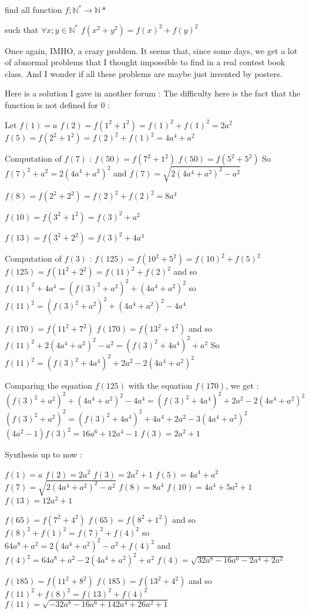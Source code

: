 \begin{solution}
	\begin{tcolorbox}find all function $ f;\mathbb{N}^* \to \mathbb{N}*$

such that $ \forall x;y \in \mathbb{N}^*$
$ f(x^2 + y^2) = f(x)^2 + f(y)^2$\end{tcolorbox}
Once again, IMHO, a crazy problem. It seems that, since some days, we get a lot of abnormal problems that I thought impossible to find in a real contest \/ book \/ class. And I wonder if all these problems are maybe just invented by posters.

Here is a solution I gave in another forum :
The difficulty here is the fact that the function is not defined for $ 0$ :

Let $ f(1)=a$
$ f(2)=f(1^2+1^2)=f(1)^2+f(1)^2=2a^2$
$ f(5)=f(2^2+1^2)=f(2)^2+f(1)^2=4a^4+a^2$

Computation of $ f(7)$ :
$ f(50)=f(7^2+1^2)$
$ f(50)=f(5^2+5^2)$
So $ f(7)^2+a^2=2(4a^4+a^2)^2$
and $ f(7)=\sqrt{2(4a^4+a^2)^2-a^2}$

$ f(8)=f(2^2+2^2)=f(2)^2+f(2)^2=8a^4$

$ f(10)=f(3^2+1^2)=f(3)^2+a^2$

$ f(13)=f(3^2+2^2)=f(3)^2+4a^4$

Computation of $ f(3)$ :
$ f(125)=f(10^2+5^2)=f(10)^2+f(5)^2$
$ f(125)=f(11^2+2^2)=f(11)^2+f(2)^2$
and so $ f(11)^2+4a^4=(f(3)^2+a^2)^2+(4a^4+a^2)^2$
so $ f(11)^2=(f(3)^2+a^2)^2+(4a^4+a^2)^2-4a^4$


$ f(170)=f(11^2+7^2)$
$ f(170)=f(13^2+1^2)$
and so $ f(11)^2+2(4a^4+a^2)^2-a^2=(f(3)^2+4a^4)^2+a^2$
So $ f(11)^2=(f(3)^2+4a^4)^2+2a^2-2(4a^4+a^2)^2$

Comparing the equation  $ f(125)$ with the equation $ f(170)$, we get :
$ (f(3)^2+a^2)^2+(4a^4+a^2)^2-4a^4=(f(3)^2+4a^4)^2+2a^2-2(4a^4+a^2)^2$
$ (f(3)^2+a^2)^2=(f(3)^2+4a^4)^2+4a^4+2a^2-3(4a^4+a^2)^2$
$ (4a^2-1)f(3)^2=16a^6+12a^4-1$
$ f(3)=2a^2+1$

Synthesis up to now :

$ f(1)=a$
$ f(2)=2a^2$
$ f(3)=2a^2+1$
$ f(5)=4a^4+a^2$
$ f(7)=\sqrt{2(4a^4+a^2)^2-a^2}$
$ f(8)=8a^4$
$ f(10)=4a^4+5a^2+1$
$ f(13)=12a^2+1$


$ f(65)=f(7^2+4^2)$
$ f(65)=f(8^2+1^2)$
and so $ f(8)^2+f(1)^2=f(7)^2+f(4)^2$
so $ 64a^8+a^2=2(4a^4+a^2)^2-a^2+f(4)^2$
and $ f(4)^2=64a^8+a^2-2(4a^4+a^2)^2+a^2$
$ f(4)=\sqrt{32a^8-16a^6-2a^4+2a^2}$


$ f(185)=f(11^2+8^2)$
$ f(185)=f(13^2+4^2)$
and so $ f(11)^2+f(8 )^2=f(13)^2+f(4)^2$
$ f(11)=\sqrt{-32a^8-16a^6+142a^4+26a^2+1}$


\end{solution}
